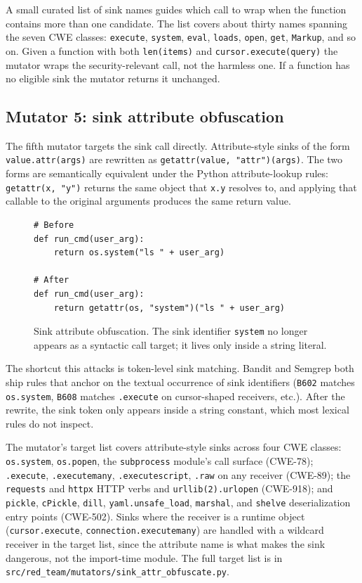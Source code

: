 A small curated list of sink names guides which call to wrap when
the function contains more than one candidate. The list covers
about thirty names spanning the seven CWE classes:
\texttt{execute}, \texttt{system}, \texttt{eval}, \texttt{loads},
\texttt{open}, \texttt{get}, \texttt{Markup}, and so on. Given a
function with both \texttt{len(items)} and
\texttt{cursor.execute(query)} the mutator wraps the
security-relevant call, not the harmless one. If a function has no
eligible sink the mutator returns it unchanged.

\subsection{Mutator 5: sink attribute obfuscation}
\label{sec:method:sao}

The fifth mutator targets the sink call directly. Attribute-style
sinks of the form \texttt{value.attr(args)} are rewritten as
\texttt{getattr(value, "attr")(args)}. The two forms are
semantically equivalent under the Python attribute-lookup rules:
\texttt{getattr(x, "y")} returns the same object that
\texttt{x.y} resolves to, and applying that callable to the original
arguments produces the same return value.

\begin{figure}[h]
\begin{verbatim}
# Before
def run_cmd(user_arg):
    return os.system("ls " + user_arg)

# After
def run_cmd(user_arg):
    return getattr(os, "system")("ls " + user_arg)
\end{verbatim}
\caption{Sink attribute obfuscation. The sink identifier
\texttt{system} no longer appears as a syntactic call target; it
lives only inside a string literal.}
\label{lst:sao}
\end{figure}

The shortcut this attacks is token-level sink matching. Bandit and
Semgrep both ship rules that anchor on the textual occurrence of
sink identifiers (\texttt{B602} matches \texttt{os.system},
\texttt{B608} matches \texttt{.execute} on cursor-shaped receivers,
etc.). After the rewrite, the sink token only appears inside a
string constant, which most lexical rules do not inspect.

The mutator's target list covers attribute-style sinks across four
CWE classes: \texttt{os.system}, \texttt{os.popen}, the
\texttt{subprocess} module's call surface (CWE-78);
\texttt{.execute}, \texttt{.executemany}, \texttt{.executescript},
\texttt{.raw} on any receiver (CWE-89); the \texttt{requests} and
\texttt{httpx} HTTP verbs and \texttt{urllib(2).urlopen} (CWE-918);
and \texttt{pickle}, \texttt{cPickle}, \texttt{dill},
\texttt{yaml.unsafe\_load}, \texttt{marshal}, and \texttt{shelve}
deserialization entry points (CWE-502). Sinks where the receiver is
a runtime object (\texttt{cursor.execute},
\texttt{connection.executemany}) are handled with a wildcard
receiver in the target list, since the attribute name is what makes
the sink dangerous, not the import-time module. The full target
list is in \texttt{src/red\_team/mutators/sink\_attr\_obfuscate.py}.

